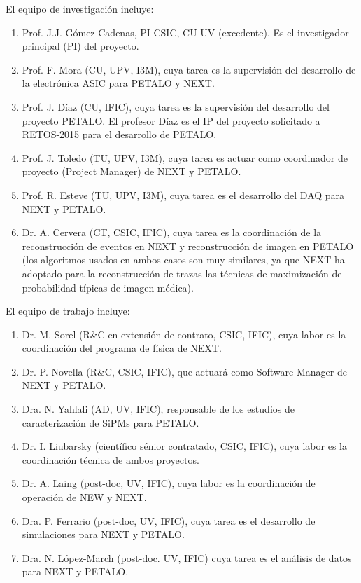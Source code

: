 El equipo de investigación incluye: 

\begin{enumerate}
\item Prof. J.J. Gómez-Cadenas, PI CSIC, CU UV (excedente). Es el investigador principal (PI) del proyecto. 
\item Prof. F. Mora (CU, UPV, I3M), cuya tarea es la supervisión del desarrollo de la electrónica ASIC para PETALO y NEXT.
\item Prof. J. Díaz (CU, IFIC), cuya tarea es la supervisión del desarrollo del proyecto PETALO. El profesor Díaz es el IP del proyecto solicitado a RETOS-2015 para el desarrollo de PETALO. 
\item Prof. J. Toledo (TU, UPV, I3M), cuya tarea es actuar como coordinador de proyecto (Project Manager) de NEXT y PETALO.
\item Prof. R. Esteve (TU, UPV, I3M), cuya tarea es el desarrollo del DAQ para NEXT y PETALO.
\item Dr. A. Cervera (CT, CSIC, IFIC), cuya tarea es la coordinación de la reconstrucción de eventos en NEXT y reconstrucción de imagen en PETALO (los algoritmos usados en ambos casos son muy similares, ya que NEXT ha adoptado para la reconstrucción de trazas las técnicas de maximización de probabilidad típicas de imagen médica).
\end{enumerate}

El equipo de trabajo incluye:
\begin{enumerate}
\item Dr. M. Sorel (R\&C en extensión de contrato, CSIC, IFIC), cuya labor es la coordinación del programa de física de NEXT.
\item Dr. P. Novella (R\&C, CSIC, IFIC), que actuará como Software Manager de NEXT y PETALO.
\item Dra. N. Yahlali (AD, UV, IFIC), responsable de los estudios de caracterización de SiPMs para PETALO. 
\item Dr. I. Liubarsky (científico sénior contratado, CSIC, IFIC), cuya labor es la coordinación técnica de ambos proyectos.
\item Dr. A. Laing (post-doc, UV, IFIC), cuya labor es la coordinación de operación de NEW y NEXT.
\item Dra. P. Ferrario (post-doc, UV, IFIC), cuya tarea es el desarrollo de simulaciones para NEXT y PETALO. 
\item Dra. N. López-March (post-doc. UV, IFIC) cuya tarea es el análisis de datos para NEXT y PETALO.
\end{enumerate}

